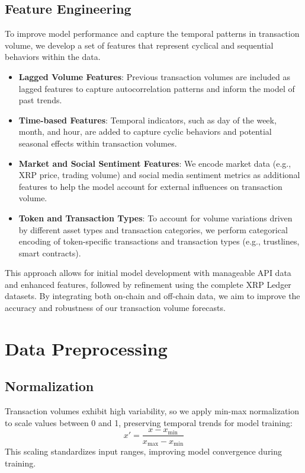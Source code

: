\documentclass{article}
\begin{document}
\subsection{Feature Engineering}
To improve model performance and capture the temporal patterns in transaction volume, we develop a set of features that represent cyclical and sequential behaviors within the data.

\begin{itemize}
    \item \textbf{Lagged Volume Features}: Previous transaction volumes are included as lagged features to capture autocorrelation patterns and inform the model of past trends.
    \item \textbf{Time-based Features}: Temporal indicators, such as day of the week, month, and hour, are added to capture cyclic behaviors and potential seasonal effects within transaction volumes.
    \item \textbf{Market and Social Sentiment Features}: We encode market data (e.g., XRP price, trading volume) and social media sentiment metrics as additional features to help the model account for external influences on transaction volume.
    \item \textbf{Token and Transaction Types}: To account for volume variations driven by different asset types and transaction categories, we perform categorical encoding of token-specific transactions and transaction types (e.g., trustlines, smart contracts).
\end{itemize}

This approach allows for initial model development with manageable API data and enhanced features, followed by refinement using the complete XRP Ledger datasets. By integrating both on-chain and off-chain data, we aim to improve the accuracy and robustness of our transaction volume forecasts.

\section{Data Preprocessing}

\subsection{Normalization}
Transaction volumes exhibit high variability, so we apply min-max normalization to scale values between 0 and 1, preserving temporal trends for model training:
\begin{equation}
    x' = \frac{x - x_{\text{min}}}{x_{\text{max}} - x_{\text{min}}}
\end{equation}
This scaling standardizes input ranges, improving model convergence during training.
\end{document}
